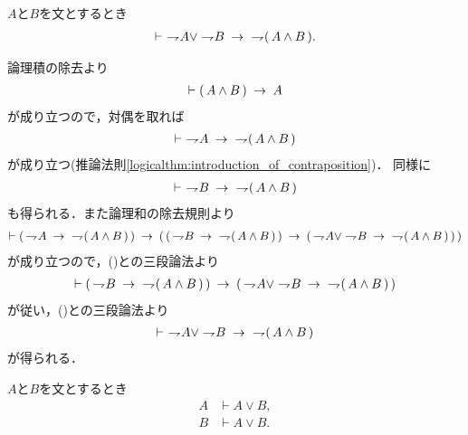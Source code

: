 	\begin{screen}
		\begin{logicalthm}
		\label{logicalthm:strong_De_Morgan_law_1}
			$A$と$B$を文とするとき
			\begin{align}
				\vdash\ \negation A \vee \negation B
				\rarrow\ \negation (\, A \wedge B\, ).
			\end{align}
		\end{logicalthm}
	\end{screen}
	
	\begin{prf}
		論理積の除去より
		\begin{align}
			\vdash (\, A \wedge B\, ) \rarrow A
		\end{align}
		が成り立つので，対偶を取れば
		\begin{align}
			\vdash\ \negation A \rarrow\ \negation (\, A \wedge B\, )
			\label{fom:strong_De_Morgan_law_1_1}
		\end{align}
		が成り立つ(推論法則\ref{logicalthm:introduction_of_contraposition})．
		同様に
		\begin{align}
			\vdash\ \negation B \rarrow\ \negation (\, A \wedge B\, )
			\label{fom:strong_De_Morgan_law_1_2}
		\end{align}
		も得られる．また論理和の除去規則より
		\begin{align}
			\vdash (\, \negation A \rarrow\ \negation (\, A \wedge B\, )\, )
			\rarrow (\, (\, \negation B \rarrow\ \negation (\, A \wedge B\, )\, )
			\rarrow (\, \negation A \vee \negation B 
			\rarrow\ \negation (\, A \wedge B\, )\, )\, )
		\end{align}
		が成り立つので，()との三段論法より
		\begin{align}
			\vdash (\, \negation B \rarrow\ \negation (\, A \wedge B\, )\, )
			\rarrow (\, \negation A \vee \negation B 
			\rarrow\ \negation (\, A \wedge B\, )\, )
		\end{align}
		が従い，()との三段論法より
		\begin{align}
			\vdash\ \negation A \vee \negation B 
			\rarrow\ \negation (\, A \wedge B\, )
		\end{align}
		が得られる．
		\QED
	\end{prf}
	
	\begin{screen}
		\begin{logicalaxm}[論理和の導入]
		\label{logicalaxm:introduction_of_disjunction}
			$A$と$B$を文とするとき
			\begin{align}
				A &\vdash A \vee B, \\
				B &\vdash A \vee B.
			\end{align}
		\end{logicalaxm}
	\end{screen}
	
